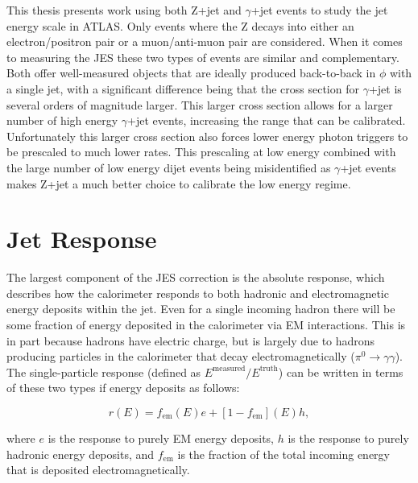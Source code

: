 This thesis presents work using both Z+jet and $\gamma$+jet events to study the jet energy scale in ATLAS.  
Only events where the Z decays into either an electron/positron pair or a muon/anti-muon pair are considered.  
When it comes to measuring the JES these two types of events are similar and complementary.  
Both offer well-measured objects that are ideally produced back-to-back in $\phi$ with a single jet, with a significant difference being that the cross section for $\gamma$+jet is several orders of magnitude larger.   
This larger cross section allows for a larger number of high energy $\gamma$+jet events, increasing the range that can be calibrated.  
Unfortunately this larger cross section also forces lower energy photon triggers to be prescaled to much lower rates.  
This prescaling at low energy combined with the large number of low energy dijet events being misidentified as $\gamma$+jet events makes Z+jet a much better choice to calibrate the low energy regime.  

\section{Jet Response}
\label{sec:JetResponse}
The largest component of the JES correction is the absolute response, which describes how the calorimeter responds to both hadronic and electromagnetic energy deposits within the jet.  
Even for a single incoming hadron there will be some fraction of energy deposited in the calorimeter via EM interactions.  
This is in part because hadrons have electric charge, but is largely due to hadrons producing particles in the calorimeter that decay electromagnetically ($\pi^0\rightarrow\gamma\gamma$).  
The single-particle response (defined as $E^{\mathrm {measured}} / E^{\mathrm {truth}}$) can be written in terms of these two types if energy deposits as follows:

\begin{equation}
  \label{SingleParticleResponse}
  r(E)=f_{\mathrm{em}}\left(E\right)e+\left[1-f_{\mathrm{em}}\right]\left(E\right)h,
 \end{equation}

\noindent
where $e$ is the response to purely EM energy deposits, $h$ is the response to purely hadronic energy deposits, and $f_{\mathrm{em}}$ is the fraction of the total incoming energy that is deposited electromagnetically.  

